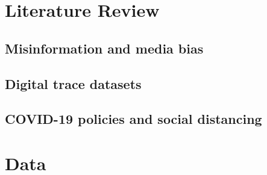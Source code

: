 \documentclass{article}
\begin{document}
\section{Literature Review}
\subsection{Misinformation and media bias}
\subsection{Digital trace datasets}
\subsection{COVID-19 policies and social distancing}

\section{Data}


\end{document}
